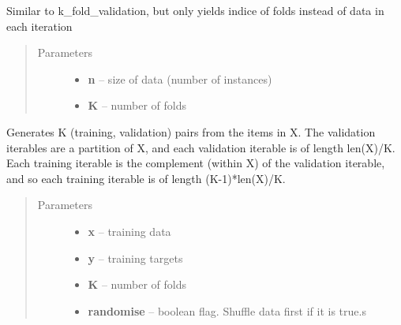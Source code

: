 \documentclass[letterpaper,10pt,english]{sphinxmanual}
\begin{document}

\begin{fulllineitems}
\label{pyGPs.Validation:pyGPs.Validation.valid.k_fold_index}
Similar to k\_fold\_validation,
but only yields indice of folds instead of data in each iteration
\begin{quote}\begin{description}
\item[{Parameters}] \leavevmode\begin{itemize}
\item {} 
\textbf{n} -- size of data (number of instances)

\item {} 
\textbf{K} -- number of folds

\end{itemize}

\end{description}\end{quote}

\end{fulllineitems}


\begin{fulllineitems}
\label{pyGPs.Validation:pyGPs.Validation.valid.k_fold_validation}
Generates K (training, validation) pairs from the items in X.
The validation iterables are a partition of X, and each validation
iterable is of length len(X)/K. Each training iterable is the
complement (within X) of the validation iterable, and so each training
iterable is of length (K-1)*len(X)/K.
\begin{quote}\begin{description}
\item[{Parameters}] \leavevmode\begin{itemize}
\item {} 
\textbf{x} -- training data

\item {} 
\textbf{y} -- training targets

\item {} 
\textbf{K} -- number of folds

\item {} 
\textbf{randomise} -- boolean flag. Shuffle data first if it is true.s

\end{itemize}

\end{description}\end{quote}

\end{fulllineitems}
\end{document}
